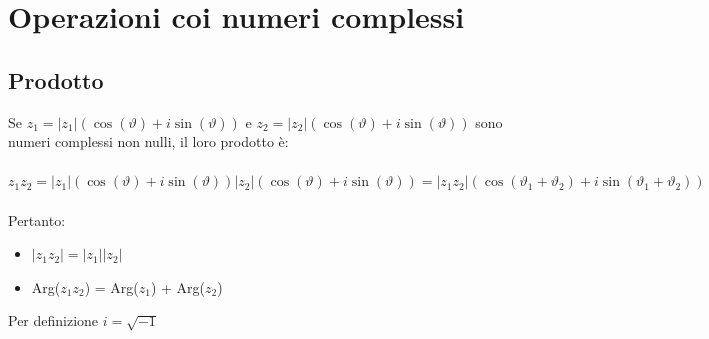 \documentclass{report}
\begin{document}
\section{Operazioni coi numeri complessi}
\subsection{Prodotto}
Se $z_1 = |z_1|(\cos(\vartheta) + i\sin(\vartheta))$ e $z_2 = |z_2|(\cos(\vartheta) + i\sin(\vartheta))$ sono numeri complessi non nulli, il loro prodotto è:
\\ \\
$z_1 z_2 = |z_1|(\cos(\vartheta) + i\sin(\vartheta)) |z_2|(\cos(\vartheta) + i\sin(\vartheta)) =  |z_1 z_2|(\cos(\vartheta_1 + \vartheta_2) + i\sin(\vartheta_1 + \vartheta_2))$
\\ \\
Pertanto:
\begin{itemize}
    \item{$|z_1z_2| = |z_1| |z_2|$}
    \item{Arg($z_1z_2$) = Arg($z_1$) + Arg($z_2$)}
\end{itemize}
Per definizione $i = \sqrt{-1}$
\end{document}
